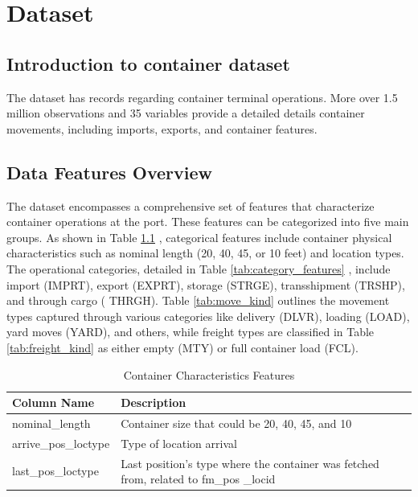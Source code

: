 \chapter{Dataset}%


	\section{Introduction to container dataset}
		The dataset has records regarding container terminal operations. More over 1.5 million observations and 35
		variables provide a detailed details container movements, including imports, exports, and container features.


	\section{Data Features Overview}

		The dataset encompasses a comprehensive set of features that characterize container operations at the port.
		These features can be categorized into five main groups. As shown in Table \ref{tab:container_chars}
		, categorical features include container physical characteristics such as nominal length (20, 40,
		45, or 10 feet) and location types. The operational categories, detailed in Table \ref{tab:category_features}
		, include import (IMPRT), export (EXPRT), storage (STRGE), transshipment (TRSHP), and through cargo (
		THRGH). Table \ref{tab:move_kind}
		outlines the movement types captured through various categories like delivery (DLVR), loading (LOAD),
		yard moves (YARD), and others, while freight types are classified in Table \ref{tab:freight_kind}
		as either empty (MTY) or full container load (FCL).

		\begin{table}[H]
			\centering
			\begin{tabular}{p{}p{}}
				\hline
				\textbf{Column Name} & \textbf{Description}
				\\
				\hline
				nominal\_length & Container size that could be 20, 40, 45, and 10
				\\
				\hline
				arrive\_pos\_loctype & Type of location arrival
				\\
				\hline
				last\_pos\_loctype & Last position's type where the container was fetched from, related to fm\_pos
				\_locid \\
				\hline
			\end{tabular}
			\caption{Container Characteristics Features}
			\label{tab:container_chars}
		\end{table}

